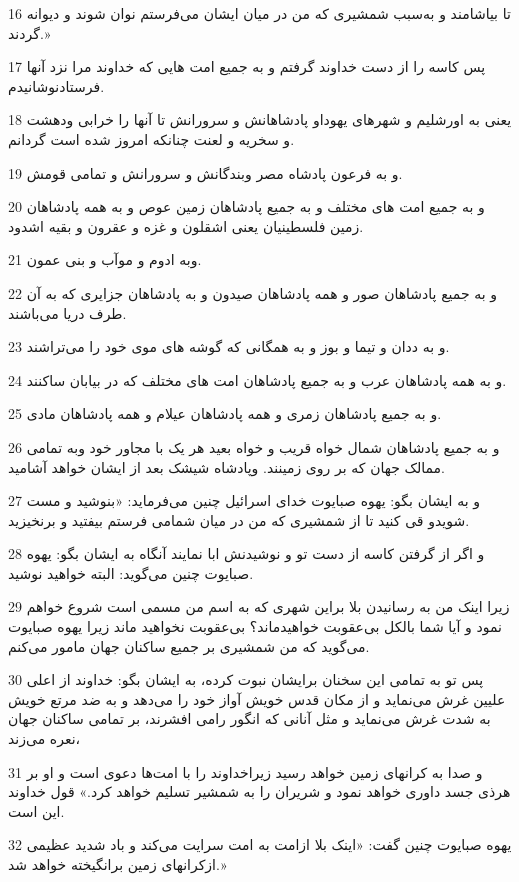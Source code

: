 \par 16 تا بیاشامند و به‌سبب شمشیری که من در میان ایشان می‌فرستم نوان شوند و دیوانه گردند.»
\par 17 پس کاسه را از دست خداوند گرفتم و به جمیع امت هایی که خداوند مرا نزد آنها فرستادنوشانیدم.
\par 18 یعنی به اورشلیم و شهرهای یهوداو پادشاهانش و سرورانش تا آنها را خرابی ودهشت و سخریه و لعنت چنانکه امروز شده است گردانم.
\par 19 و به فرعون پادشاه مصر وبندگانش و سرورانش و تمامی قومش.
\par 20 و به جمیع امت های مختلف و به جمیع پادشاهان زمین عوص و به همه پادشاهان زمین فلسطینیان یعنی اشقلون و غزه و عقرون و بقیه اشدود.
\par 21 وبه ادوم و موآب و بنی عمون.
\par 22 و به جمیع پادشاهان صور و همه پادشاهان صیدون و به پادشاهان جزایری که به آن طرف دریا می‌باشند.
\par 23 و به ددان و تیما و بوز و به همگانی که گوشه های موی خود را می‌تراشند.
\par 24 و به همه پادشاهان عرب و به جمیع پادشاهان امت های مختلف که در بیابان ساکنند.
\par 25 و به جمیع پادشاهان زمری و همه پادشاهان عیلام و همه پادشاهان مادی.
\par 26 و به جمیع پادشاهان شمال خواه قریب و خواه بعید هر یک با مجاور خود وبه تمامی ممالک جهان که بر روی زمینند. وپادشاه شیشک بعد از ایشان خواهد آشامید.
\par 27 و به ایشان بگو: یهوه صبایوت خدای اسرائیل چنین می‌فرماید: «بنوشید و مست شویدو قی کنید تا از شمشیری که من در میان شمامی فرستم بیفتید و برنخیزید.
\par 28 و اگر از گرفتن کاسه از دست تو و نوشیدنش ابا نمایند آنگاه به ایشان بگو: یهوه صبایوت چنین می‌گوید: البته خواهید نوشید.
\par 29 زیرا اینک من به رسانیدن بلا براین شهری که به اسم من مسمی است شروع خواهم نمود و آیا شما بالکل بی‌عقوبت خواهیدماند؟ بی‌عقوبت نخواهید ماند زیرا یهوه صبایوت می‌گوید که من شمشیری بر جمیع ساکنان جهان مامور می‌کنم.
\par 30 پس تو به تمامی این سخنان برایشان نبوت کرده، به ایشان بگو: خداوند از اعلی علیین غرش می‌نماید و از مکان قدس خویش آواز خود را می‌دهد و به ضد مرتع خویش به شدت غرش می‌نماید و مثل آنانی که انگور رامی افشرند، بر تمامی ساکنان جهان نعره می‌زند،
\par 31 و صدا به کرانهای زمین خواهد رسید زیراخداوند را با امت‌ها دعوی است و او بر هرذی جسد داوری خواهد نمود و شریران را به شمشیر تسلیم خواهد کرد.» قول خداوند این است.
\par 32 یهوه صبایوت چنین گفت: «اینک بلا ازامت به امت سرایت می‌کند و باد شدید عظیمی ازکرانهای زمین برانگیخته خواهد شد.»
